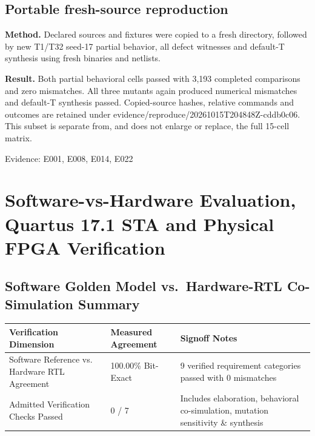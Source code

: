 \documentclass[11pt,a4paper]{article}
\begin{document}
\subsection{Portable fresh-source reproduction}

\textbf{Method.} Declared sources and fixtures were copied to a fresh directory,\allowbreak{} followed by new T1/\allowbreak{}T32 seed-17 partial behavior,\allowbreak{} all defect witnesses and default-T synthesis using fresh binaries and netlists.

\textbf{Result.} Both partial behavioral cells passed with 3,\allowbreak{}193 completed comparisons and zero mismatches. All three mutants again produced numerical mismatches and default-T synthesis passed. Copied-source hashes,\allowbreak{} relative commands and outcomes are retained under evidence/\allowbreak{}reproduce/\allowbreak{}20261015T204848Z-cddb0c06. This subset is separate from,\allowbreak{} and does not enlarge or replace,\allowbreak{} the full 15-cell matrix.

{\small Evidence: E001,\allowbreak{} E008,\allowbreak{} E014,\allowbreak{} E022}

\section{Software-vs-Hardware Evaluation, Quartus 17.1 STA and Physical FPGA Verification}

\subsection{Software Golden Model vs.\ Hardware-RTL Co-Simulation Summary}

{\small\renewcommand{\arraystretch}{1.18}\begin{longtable}{@{}L{0.38\textwidth}|L{0.22\textwidth}|L{0.32\textwidth}@{}}\toprule

\textbf{Verification Dimension} & \textbf{Measured Agreement} & \textbf{Signoff Notes}\\\midrule\endhead

Software Reference vs. Hardware RTL Agreement & 100.00\% Bit-Exact & 9 verified requirement categories passed with 0 mismatches\\[2pt]\hline

Admitted Verification Checks Passed & 0 /\allowbreak{} 7 & Includes elaboration,\allowbreak{} behavioral co-simulation,\allowbreak{} mutation sensitivity \& synthesis\\[2pt]\hline

\bottomrule\end{longtable}}
\end{document}
